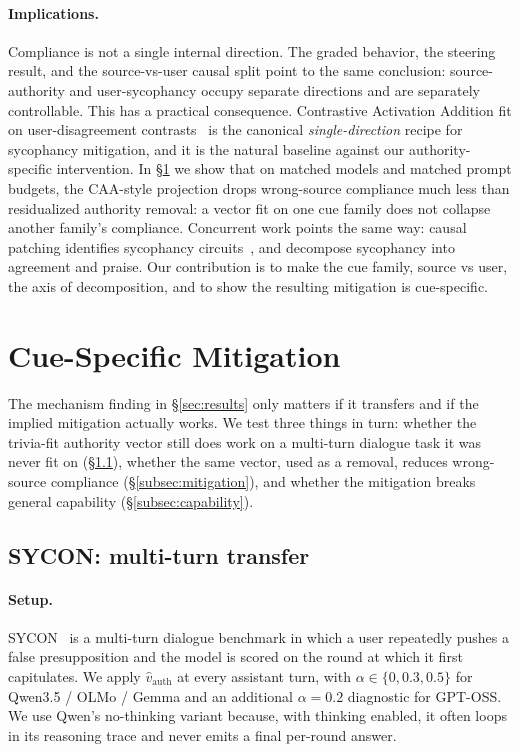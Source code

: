 \documentclass{article}
\begin{document}
\paragraph{Implications.}
Compliance is not a single internal direction. The graded behavior, the steering result, and the source-vs-user causal split point to the same conclusion: source-authority and user-sycophancy occupy separate directions and are separately controllable. This has a practical consequence. Contrastive Activation Addition fit on user-disagreement contrasts~\citep{rimsky2024caa} is the canonical \emph{single-direction} recipe for sycophancy mitigation, and it is the natural baseline against our authority-specific intervention. In §\ref{sec:transfer-mitigation} we show that on matched models and matched prompt budgets, the CAA-style projection drops wrong-source compliance much less than residualized authority removal: a vector fit on one cue family does not collapse another family's compliance. Concurrent work points the same way: causal patching identifies sycophancy circuits~\citep{li2025truth_overridden}, and \citet{vennemeyer2025sycophancy_not_one_thing} decompose sycophancy into agreement and praise. Our contribution is to make the cue family, source vs user, the axis of decomposition, and to show the resulting mitigation is cue-specific.


\section{Cue-Specific Mitigation}
\label{sec:transfer-mitigation}

The mechanism finding in \S\ref{sec:results} only matters if it transfers and if the implied mitigation actually works. We test three things in turn: whether the trivia-fit authority vector still does work on a multi-turn dialogue task it was never fit on (\S\ref{subsec:transfer}), whether the same vector, used as a removal, reduces wrong-source compliance (\S\ref{subsec:mitigation}), and whether the mitigation breaks general capability (\S\ref{subsec:capability}).

\subsection{SYCON: multi-turn transfer}
\label{subsec:transfer}

\paragraph{Setup.} SYCON~\citep{hong2025syconbench} is a multi-turn dialogue benchmark in which a user repeatedly pushes a false presupposition and the model is scored on the round at which it first capitulates. We apply $\hat{v}_{\mathrm{auth}}$ at every assistant turn, with $\alpha \in \{0, 0.3, 0.5\}$ for Qwen3.5 / OLMo / Gemma and an additional $\alpha=0.2$ diagnostic for GPT-OSS. We use Qwen's no-thinking variant because, with thinking enabled, it often loops in its reasoning trace and never emits a final per-round answer.
\end{document}
